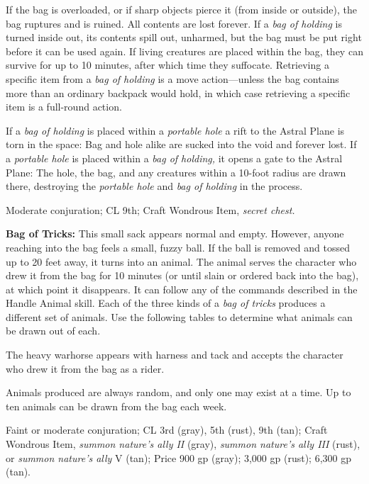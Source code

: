 If the bag is overloaded, or if sharp objects pierce it (from inside or outside), 
the bag ruptures and is ruined. All contents are lost forever. If a \textit{bag 
of holding }is turned inside out, its contents spill out, unharmed, but the bag 
must be put right before it can be used again. If living creatures are placed within 
the bag, they can survive for up to 10 minutes, after which time they suffocate. 
Retrieving a specific item from a \textit{bag of holding }is a move action---unless 
the bag contains more than an ordinary backpack would hold, in which case retrieving 
a specific item is a full-round action.

If a \textit{bag of holding }is placed within a \textit{portable hole} a rift to 
the Astral Plane is torn in the space: Bag and hole alike are sucked into the void 
and forever lost. If a \textit{portable hole }is placed within a \textit{bag of 
holding, }it opens a gate to the Astral Plane: The hole, the bag, and any creatures 
within a 10-foot radius are drawn there, destroying the \textit{portable hole }and 
\textit{bag of holding }in the process.

Moderate conjuration; CL 9th; Craft Wondrous Item, \textit{secret chest.}

\textbf{Bag of Tricks: }This small sack appears normal and empty. However, anyone 
reaching into the bag feels a small, fuzzy ball. If the ball is removed and tossed 
up to 20 feet away, it turns into an animal. The animal serves the character who 
drew it from the bag for 10 minutes (or until slain or ordered back into the bag), 
at which point it disappears. It can follow any of the commands described in the 
Handle Animal skill. Each of the three kinds of a \textit{bag of tricks }produces 
a different set of animals. Use the following tables to determine what animals 
can be drawn out of each.

The heavy warhorse appears with harness and tack and accepts the character who 
drew it from the bag as a rider.

Animals produced are always random, and only one may exist at a time. Up to ten 
animals can be drawn from the bag each week.

Faint or moderate conjuration; CL 3rd (gray), 5th (rust), 9th (tan); Craft Wondrous 
Item, \textit{summon nature's ally II }(gray), \textit{summon nature's ally III 
}(rust), or \textit{summon nature's ally }V (tan); Price 900 gp (gray); 3,000 gp 
(rust); 6,300 gp (tan).

